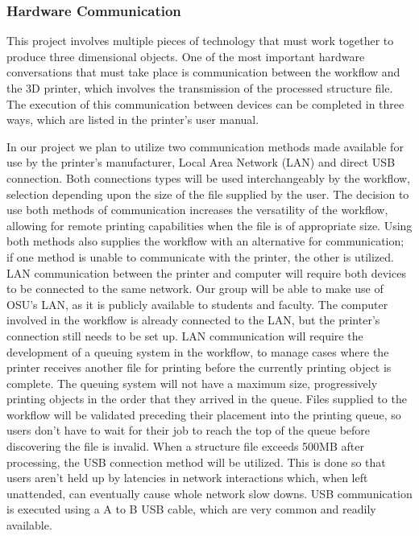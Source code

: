 \documentclass[letterpaper, onecolumn, draftclsnofoot, 10pt, compsoc]{IEEEtran}
\begin{document}
\begin{singlespace}
        \subsubsection{Hardware Communication}
        This project involves multiple pieces of technology that must work together to produce three dimensional objects. 
        One of the most important hardware conversations that must take place is communication between the workflow and the 3D printer, which involves the transmission of the processed structure file.
        The execution of this communication between devices can be completed in three ways, which are listed in the printer's user manual. \cite{printer}\par
        
        In our project we plan to utilize two communication methods made available for use by the printer's manufacturer, Local Area Network (LAN) and direct USB connection. 
        Both connections types will be used interchangeably by the workflow, selection depending upon the size of the file supplied by the user.
		The decision to use both methods of communication increases the versatility of the workflow, allowing for remote printing capabilities when the file is of appropriate size. \cite{network}
        Using both methods also supplies the workflow with an alternative for communication; if one method is unable to communicate with the printer, the other is utilized.
        LAN communication between the printer and computer will require both devices to be connected to the same network.
        Our group will be able to make use of OSU's LAN, as it is publicly available to students and faculty.
        The computer involved in the workflow is already connected to the LAN, but the printer's connection still needs to be set up.
        LAN communication will require the development of a queuing system in the workflow, to manage cases where the printer receives another file for printing before the currently printing object is complete.
        The queuing system will not have a maximum size, progressively printing objects in the order that they arrived in the queue.
        Files supplied to the workflow will be validated preceding their placement into the printing queue, so users don't have to wait for their job to reach the top of the queue before discovering the file is invalid. 
        When a structure file exceeds 500MB after processing, the USB connection method will be utilized.
        This is done so that users aren't held up by latencies in network interactions which, when left unattended, can eventually cause whole network slow downs.
        USB communication is executed using a A to B USB cable, which are very common and readily available.
        

\end{singlespace}
\end{document}
